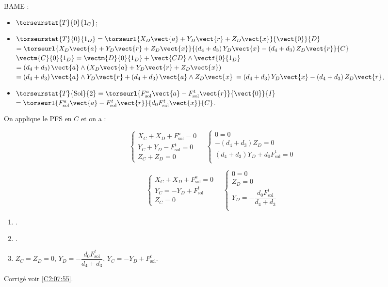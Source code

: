 BAME :
\begin{itemize}
\item $\torseurstat{T}{0}{1_C}$;
\item $\torseurstat{T}{0}{1_D} =  \torseurl{X_D\vect{a}+Y_D\vect{r}+Z_D\vect{x}}{\vect{0}}{D}$ 
$=  \torseurl{X_D\vect{a}+Y_D\vect{r}+Z_D\vect{x}}{ \left( d_4 +d_3 \right) Y_D \vect{x}-\left( d_4 +d_3 \right)  Z_D\vect{r}}{C}$
$\vectm{C}{0}{1_D}= \vectm{D}{0}{1_D} + \vect{CD}\wedge \vectf{0}{1_D}$
$= \left( d_4 +d_3 \right) \vect{a} \wedge \left( X_D\vect{a}+Y_D\vect{r}+Z_D\vect{x}\right)$
$= \left( d_4 +d_3 \right) \vect{a} \wedge  Y_D\vect{r}+\left( d_4 +d_3 \right) \vect{a} \wedge Z_D\vect{x}$
$= \left( d_4 +d_3 \right) Y_D \vect{x}-\left( d_4 +d_3 \right)  Z_D\vect{r}$.
\item $\torseurstat{T}{\text{Sol}}{2} =\torseurl{F_{\text{sol}}^a \vect{a}-F_{\text{sol}}^t \vect{r}}{\vect{0}}{I} $ 
$=\torseurl{F_{\text{sol}}^a \vect{a}-F_{\text{sol}}^t \vect{r}}{d_0F_{\text{sol}}^t \vect{x}}{C} $.
\end{itemize}

On applique le PFS en $C$ et on a : 

$$
\left\{
\begin{array}{l}
X_C + X_D + F_{\text{sol}}^a = 0\\
Y_C + Y_D - F_{\text{sol}}^t = 0\\
Z_C + Z_ D = 0 
\end{array}
\right.
\quad 
\left\{ 
\begin{array}{l}
0 = 0\\
-\left( d_4 +d_3 \right)  Z_D = 0 \\
\left( d_4 +d_3 \right) Y_D  + d_0F_{\text{sol}}^t= 0\\
\end{array}
\right.
$$

\else
\fi



\ifprof
$$
\left\{
\begin{array}{l}
X_C + X_D + F_{\text{sol}}^a = 0\\
Y_C =- Y_D + F_{\text{sol}}^t \\
Z_C = 0 
\end{array}
\right.
\quad 
\left\{ 
\begin{array}{l}
0 = 0\\
  Z_D = 0 \\
 Y_D  = -  \dfrac{d_0F_{\text{sol}}^t}{d_4 +d_3}\\
\end{array}
\right.
$$

\else
\fi

\ifprof
\else
\footnotesize
\begin{enumerate}
\item .
\item .
\item $Z_C = Z_D = 0$, $ Y_D  = -  \dfrac{d_0F_{\text{sol}}^t}{d_4 +d_3}$, 
$Y_C =- Y_D + F_{\text{sol}}^t $.
\end{enumerate}
\normalsize

\begin{flushright}
\footnotesize{Corrigé  voir \ref{C2:07:55}.}
\end{flushright}%
\fi 
